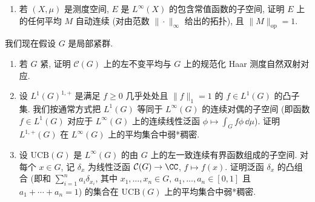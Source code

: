 \begin{exercise}[平均的连续性]
\label{ex:III.6.3.1}
\begin{enumerate}
\item[(a)] 若 $(X, \mu)$ 是测度空间, $E$ 是 $L^{\infty}(X)$ 的包含常值函数的子空间, 证明 $E$ 上的任何平均 $M$ 自动连续 (对由范数 $\|\cdot\|_{\infty}$ 给出的拓扑), 且 $\|M\|_{\mathrm{op}} = 1$.
\end{enumerate}
我们现在假设 $G$ 是局部紧群.
\begin{enumerate}
\item[(a)] 若 $G$ 紧, 证明 $\mathcal{C}(G)$ 上的左不变平均与 $G$ 上的规范化 Haar 测度自然双射对应.
\item[(b)] 设 $L^1(G)^{1,+}$ 是满足 $f \geq 0$ 几乎处处且 $\|f\|_1 = 1$ 的 $f \in L^1(G)$ 的凸子集. 我们按通常方式把 $L^1(G)$ 等同于 $L^{\infty}(G)$ 的连续对偶的子空间 (即函数 $f \in L^1(G)$ 对应于 $L^{\infty}(G)$ 上的连续线性泛函 $\phi \longmapsto \int_G f\phi\,\dd\mu$). 证明 $L^{1,+}(G)$ 在 $L^{\infty}(G)$ 上的平均集合中弱*稠密.
\item[(c)] 设 $\mathrm{UCB}(G)$ 是 $L^{\infty}(G)$ 的由 $G$ 上的左一致连续有界函数组成的子空间. 对每个 $x \in G$, 记 $\delta_x$ 为线性泛函 $\mathcal{C}(G) \to \CC$, $f \longmapsto f(x)$. 证明泛函 $\delta_x$ 的凸组合 (即和 $\sum_{i=1}^n a_i\delta_{x_i}$, 其中 $x_1, \ldots, x_n \in G$, $a_1, \ldots, a_n \in [0,1]$ 且 $a_1 + \cdots + a_n = 1$) 的集合在 $\mathrm{UCB}(G)$ 上的平均集合中弱*稠密.
\end{enumerate}
\end{exercise}


